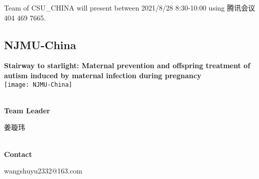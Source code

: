 Team of CSU\_CHINA will present between    2021/8/28 8:30-10:00     using 腾讯会议 404 469 7665.
\newpage


\subsection{\textcolor{Blu}{ NJMU-China } }
\vspace{5mm}
\begin{center}
\large{
  \textbf{ Stairway to starlight: Maternal prevention and offspring treatment of autism induced by maternal infection during pregnancy }\\

  \texttt{[image: NJMU-China]}
}
\end{center}
\textbf{\\Team Leader}

  姜璇玮


\textbf{\\Contact}

  wangshuyu2332@163.com


